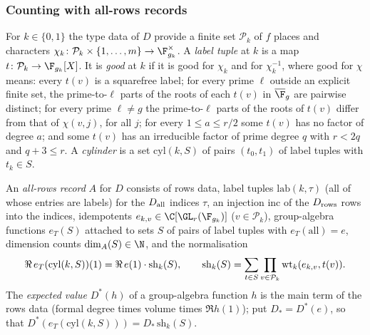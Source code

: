 \subsubsection*{Counting with all-rows records}

For $k\in\{0,1\}$ the type data of $D$ provide a finite set $\mathcal P_k$ of $f$ places and characters
$\chi_k\colon\mathcal P_k\times\{1,\dots,m\}\to\F_{g_k}^\times$. A \emph{label tuple} at $k$ is a map
$t\colon\mathcal P_k\to\F_{g_k}[X]$. It is \emph{good} at $k$ if it is good for $\chi_k$ and for $\chi_k^{-1}$, where
good for $\chi$ means: every $t(v)$ is a squarefree label; for every prime $\ell$ outside an explicit finite set,
the prime-to-$\ell$ parts of the roots of each $t(v)$ in $\overline\F_g$ are pairwise distinct; for every prime
$\ell\ne g$ the prime-to-$\ell$ parts of the roots of $t(v)$ differ from that of $\chi(v,j)$, for all $j$; for every
$1\le a\le r/2$ some $t(v)$ has no factor of degree $a$; and some $t(v)$ has an irreducible factor of prime degree
$q$ with $r<2q$ and $q+3\le r$. A \emph{cylinder} is a set $\mathrm{cyl}(k,S)$ of pairs $(t_0,t_1)$ of label tuples
with $t_k\in S$.

An \emph{all-rows record} $A$ for $D$ consists of rows data, label tuples $\mathrm{lab}(k,\tau)$ (all of whose
entries are labels) for the $D_{\rm all}$ indices $\tau$, an injection $\mathrm{inc}$ of the $D_{\rm rows}$ rows into
the indices, idempotents $e_{k,v}\in\C[\GL_r(\F_{g_k})]$ ($v\in\mathcal P_k$), group-algebra functions
$e_T(S)$ attached to sets $S$ of pairs of label tuples with $e_T(\text{all})=e$, dimension counts
$\dim_A(S)\in\N$, and the normalisation
\[
\Re\,e_T(\mathrm{cyl}(k,S))(1)=\Re\,e(1)\cdot\mathrm{sh}_k(S),\qquad
\mathrm{sh}_k(S)=\sum_{t\in S}\prod_{v\in\mathcal P_k}\mathrm{wt}_k(e_{k,v},t(v)).
\]
The \emph{expected value} $D^*(h)$ of a group-algebra function $h$ is the main term of the rows data (formal
degree times volume times $\Re h(1)$); put $D_*=D^*(e)$, so that $D^*(e_T(\mathrm{cyl}(k,S)))=D_*\,\mathrm{sh}_k(S)$.

